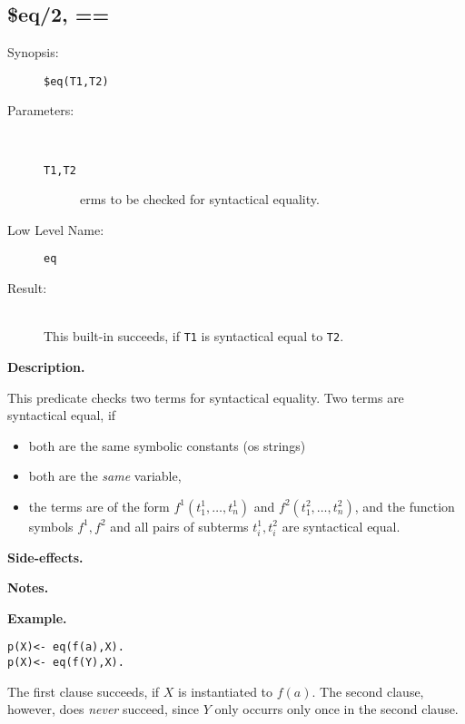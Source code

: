 %
%
%
\subsection{\$eq/2, ==}

\begin{description}
\item[Synopsis:]
	{\tt \$eq(T1,T2)}
\item[Parameters:]\ \\[-0.5cm]
	\begin{description}
	\item[{\tt T1,T2}]
erms to be checked for syntactical equality.

	\end{description}
\item[Low Level Name:]
	{\tt eq}
\item[Result:]\ \\
This built-in succeeds, if {\tt T1} is syntactical equal to
{\tt T2}.
\end{description}

\vspace*{0.5cm}
\noindent
{\bf Description.}

This predicate checks two terms for syntactical equality.
Two terms are syntactical equal, if
\begin{itemize}
\item
both are the same symbolic constants (os strings)
\item
both are the {\em same\/} variable,
\item
the terms are of the form
$f^1(t_1^1,\ldots,t_n^1)$ and
$f^2(t_1^2,\ldots,t_n^2)$, and the function symbols $f^1,f^2$ and all
pairs of subterms $t^1_i,t^2_i$ are syntactical equal.
\end{itemize}
 

\vspace*{0.5cm}
\noindent
{\bf Side-effects.}

\vspace*{0.5cm}
\noindent
{\bf Notes.}

\vspace*{0.5cm}
\noindent
{\bf Example.}
\begin{verbatim}
p(X)<- eq(f(a),X).
p(X)<- eq(f(Y),X).
\end{verbatim}
The first clause succeeds, if $X$ is instantiated to $f(a)$.
The second clause, however, does {\em never\/} succeed, since
$Y$ only occurrs only once in the second clause.
 

